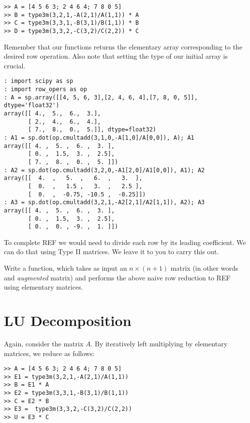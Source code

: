 \begin{matlab}
\begin{lstlisting}[style=matlab]
>> A = [4 5 6 3; 2 4 6 4; 7 8 0 5]
>> B = type3m(3,2,1,-A(2,1)/A(1,1)) * A
>> C = type3m(3,3,1,-B(3,1)/B(1,1)) * B
>> D = type3m(3,3,2,-C(3,2)/C(2,2)) * C
\end{lstlisting}
\end{matlab}

\begin{python}
Remember that our functions returns the elementary array corresponding to the desired row operation.  Also note that setting the type of our initial array is crucial.
\begin{lstlisting}[style=python]
: import scipy as sp
: import row_opers as op
: A = sp.array([[4, 5, 6, 3],[2, 4, 6, 4],[7, 8, 0, 5]], dtype='float32')
array([[ 4.,  5.,  6.,  3.],
       [ 2.,  4.,  6.,  4.],
       [ 7.,  8.,  0.,  5.]], dtype=float32)
: A1 = sp.dot(op.cmultadd(3,1,0,-A[1,0]/A[0,0]), A); A1
array([[ 4. ,  5. ,  6. ,  3. ],
       [ 0. ,  1.5,  3. ,  2.5],
       [ 7. ,  8. ,  0. ,  5. ]])
: A2 = sp.dot(op.cmultadd(3,2,0,-A1[2,0]/A1[0,0]), A1); A2
array([[  4.  ,   5.  ,   6.  ,   3.  ],
       [  0.  ,   1.5 ,   3.  ,   2.5 ],
       [  0.  ,  -0.75, -10.5 ,  -0.25]])
: A3 = sp.dot(op.cmultadd(3,2,1,-A2[2,1]/A2[1,1]), A2); A3
array([[ 4. ,  5. ,  6. ,  3. ],
       [ 0. ,  1.5,  3. ,  2.5],
       [ 0. ,  0. , -9. ,  1. ]])
\end{lstlisting}
\end{python}

To complete REF we would need to divide each row by its leading
coefficient.  We can do that using Type II matrices.  We leave it to
you to carry this out.

\begin{problem}
\label{prob:REF}
Write a \ProgrammingLanguage function, which takes as input an
$n\times (n+1)$ matrix (in other words and \emph{augmented} matrix) and performs the above naive row reduction to REF using elementary matrices.
\end{problem}

\section*{LU Decomposition}

Again, consider the matrix $A$. By iteratively left multiplying by
elementary matrices, we reduce as follows:

\begin{matlab}
\begin{lstlisting}[style=matlab]
>> A = [4 5 6 3; 2 4 6 4; 7 8 0 5]
>> E1 = type3m(3,2,1,-A(2,1)/A(1,1))
>> B = E1 * A
>> E2 = type3m(3,3,1,-B(3,1)/B(1,1))
>> C = E2 * B
>> E3 =  type3m(3,3,2,-C(3,2)/C(2,2))
>> U = E3 * C
\end{lstlisting}
\end{matlab}

